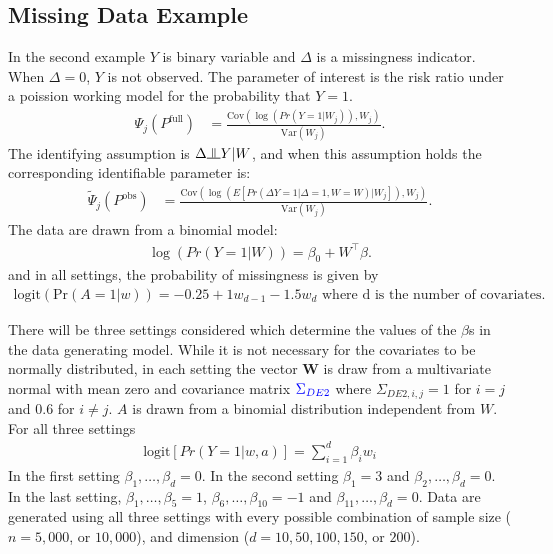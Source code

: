 \documentclass{article}
\newcommand{\pr}{\text{Pr}}
\newcommand{\indep}{\raisebox{0.05em}{\rotatebox[origin=c]{90}{$\models$}}}
\begin{document}
\subsection{Missing Data Example}
\label{sec:missing_data}
In the second example $Y$ is binary variable and $\Delta$ is a missingness indicator.  When $\Delta = 0$, $Y$ is not observed. The parameter of interest is the risk ratio under a poission working model for the probability that $Y = 1$.
\begin{align*}
	\Psi_{j}\left(P^{\text{full}}\right) &= \frac{\text{Cov}\left(\log\left(Pr \left(Y = 1 |  W_j\right)\right), W_j\right)}{\text{Var}(W_j)}.
\end{align*}
The identifying assumption is $\Delta \indep Y | W$, and when this assumption holds the corresponding identifiable parameter is:
\begin{align*}
	\tilde{\Psi}_{j}\left(P^{\text{obs}}\right)&= \frac{\text{Cov}\left(\log\left(E\left[Pr \left(\Delta  Y = 1 | \Delta = 1, W = W\right) |  W_j\right]\right), W_j\right)}{\text{Var}(W_j)}.
\end{align*}
The data are drawn from a binomial model:
\begin{align*}
    \log(Pr(Y = 1 | W)) = \beta_0 + W^\top \beta.
\end{align*}
and in all settings, the probability of missingness is given by 
\begin{align*}
	\text{logit}(\pr(A = 1 | w)) = -0.25 + 1 w_{d - 1} - 1.5 w_d \text{ where d is the number of covariates.} 
\end{align*}

There will be three settings considered which determine  the values of the $\beta$s in the data generating model.  While it is not necessary for the covariates to be normally distributed, in each setting the vector $\boldsymbol{W}$ is draw from a multivariate normal with mean zero and covariance matrix $\textcolor{blue}{\Sigma_{DE2}}$ where $\Sigma_{DE2, i, j} = 1$ for $i = j$ and $0.6$ for $i \neq j$. $A$ is drawn from a binomial distribution independent from $W$.  For all three settings 
\begin{align*}
	\text{logit}\left[Pr(Y = 1 | w, a)\right] = \sum_{i = 1}^{d} \beta_{i} w_i
\end{align*}
In the first setting $\beta_1, \dots, \beta_d = 0$.  In the second setting $\beta_1 = 3$ and $\beta_2, \dots,  \beta_d = 0$.  In the last setting, $\beta_1, \dots, \beta_5 = 1$, $\beta_6, \dots, \beta_{10} = -1$ and $\beta_{11}, \dots, \beta_d = 0$.  Data are generated using all three settings with every possible combination of sample size ($n = 5,000$, or $10,000$), and dimension ($d = 10, 50, 100, 150$, or $200$).
\end{document}

